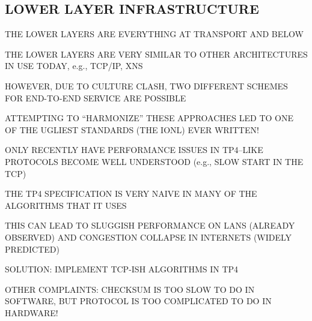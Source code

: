 \begin{bwslide}
\part*	{LOWER LAYER INFRASTRUCTURE}\bf

\begin{nrtc}
\item	THE LOWER LAYERS ARE EVERYTHING AT TRANSPORT AND BELOW

\item	THE LOWER LAYERS ARE VERY SIMILAR TO OTHER ARCHITECTURES IN USE
	TODAY, e.g., TCP/IP, XNS

\item	HOWEVER, DUE TO CULTURE CLASH, TWO DIFFERENT SCHEMES FOR END-TO-END
	SERVICE ARE POSSIBLE

\item	ATTEMPTING TO ``HARMONIZE'' THESE APPROACHES LED TO ONE OF THE UGLIEST
	STANDARDS (THE IONL) EVER WRITTEN!
\end{nrtc}
\end{bwslide}




\begin{bwslide}

\begin{nrtc}
\item	ONLY RECENTLY HAVE PERFORMANCE ISSUES IN TP4--LIKE PROTOCOLS BECOME
	WELL UNDERSTOOD (e.g., SLOW START IN THE TCP)

\item	THE TP4 SPECIFICATION IS VERY NAIVE IN MANY OF THE ALGORITHMS THAT IT
	USES

\item	THIS CAN LEAD TO SLUGGISH PERFORMANCE ON LANS (ALREADY OBSERVED)
	AND CONGESTION COLLAPSE IN INTERNETS (WIDELY PREDICTED)

\item	SOLUTION: IMPLEMENT TCP-ISH ALGORITHMS IN TP4

\item	OTHER COMPLAINTS: CHECKSUM IS TOO SLOW TO DO IN SOFTWARE, BUT PROTOCOL
	IS TOO COMPLICATED TO DO IN HARDWARE!
\end{nrtc}
\end{bwslide}


